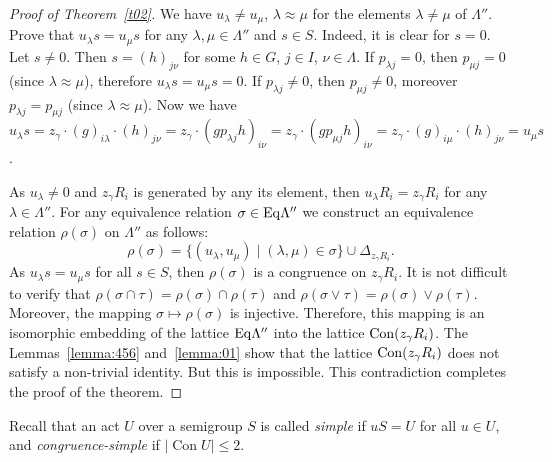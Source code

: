 \documentclass{birkau}
\numberwithin{equation}{section}
\theoremstyle{plain}
\theoremstyle{definition}
\DeclareMathOperator{\Con}{Con}
\begin{document}
\begin{proof}[Proof of Theorem~\ref{t02}]
        We have $u_\lambda \ne u_\mu$, $\lambda \approx \mu$ for the elements $\lambda \ne \mu$ of $\Lambda''$. Prove that $u_\lambda s=u_\mu s$ for any $\lambda, \mu \in \Lambda''$ and $s\in S$. Indeed, it is clear for $s=0$. Let $s\ne 0$. Then $s=(h)_{j\nu}$ for some $h\in G$, $j\in I$, $\nu \in \Lambda$. If $p_{\lambda j}=0$, then $p_{\mu j}=0$ (since $\lambda \approx \mu$), therefore $u_\lambda s=u_\mu s=0$. If $p_{\lambda j}\ne 0$, then $p_{\mu j} \ne 0$, moreover $p_{\lambda j}=p_{\mu j}$ (since $\lambda \approx \mu$). Now we have $u_\lambda s=z_\gamma\cdot (g)_{i\lambda} \cdot (h)_{j\nu} = z_\gamma\cdot (gp_{\lambda j}h)_{i\nu} = z_\gamma \cdot (gp_{\mu j}h)_{i\nu} = z_\gamma \cdot (g)_{i\mu} \cdot (h)_{j\nu} =u_\mu s$.

        As $u_\lambda \ne 0$ and $z_\gamma R_i$ is generated by any its element, then $u_\lambda R_i = z_\gamma R_i$ for any $\lambda \in \Lambda''$. For any equivalence relation $\sigma \in {\rm Eq}\Lambda''$ we construct an equivalence relation $\rho(\sigma)$ on $\Lambda''$ as follows: $$ \rho(\sigma)=\{ (u_\lambda,u_\mu) \mid (\lambda,\mu)\in \sigma \} \cup \Delta_{z_\gamma R_i}.  $$ As $u_\lambda s=u_\mu s$ for all $s\in S$, then $\rho(\sigma)$ is a congruence on $z_\gamma R_i$. It is not difficult to verify that $\rho (\sigma \cap \tau) =\rho(\sigma) \cap \rho(\tau)$ and $\rho (\sigma \vee \tau) =\rho(\sigma) \vee \rho(\tau)$. Moreover, the mapping $\sigma \mapsto \rho(\sigma)$ is injective. Therefore, this mapping is an isomorphic embedding of the lattice ${\rm Eq}\Lambda''$ into the lattice ${\rm Con}(z_\gamma R_i)$.   The Lemmas~\ref{lemma:456} and~\ref{lemma:01} show that the lattice ${\rm Con}(z_\gamma R_i)$ does not satisfy a non-trivial identity. But this is impossible. This contradiction completes the proof of the theorem.
	\end{proof}
	
	Recall that an act $U$ over a semigroup $S$ is called \textit{simple} if $uS = U$ for all $ u \in U$, and \textit{congruence-simple} if $|\Con U| \leqslant 2$.
	
\end{document}
